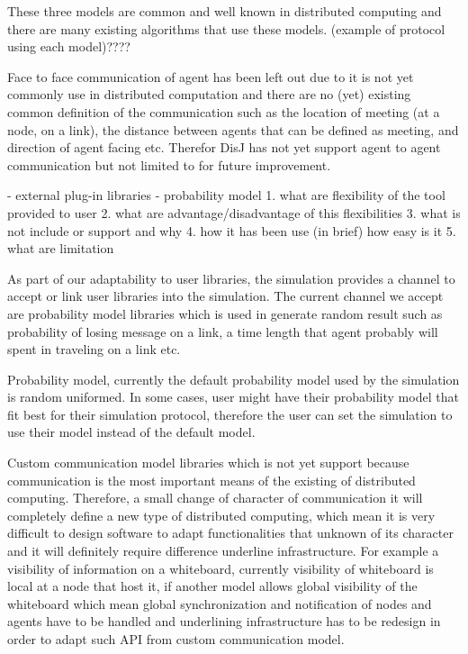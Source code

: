 These three models are common and well known in distributed computing and there are many existing algorithms that use these models. (example of protocol using each model)????

Face to face communication of agent has been left out due to it is not yet commonly use in distributed computation and there are no (yet) existing common definition of the communication such as the location of meeting (at a node, on a link), the distance between agents that can be defined as meeting, and direction of agent facing etc. Therefor DisJ has not yet support agent to agent communication but not limited to for future improvement.


- external plug-in libraries
	- probability model
1. what are flexibility of the tool provided to user
2. what are advantage/disadvantage of this flexibilities
3. what is not include or support and why
4. how it has been use (in brief) how easy is it
5. what are limitation

As part of our adaptability to user libraries, the simulation provides a channel to accept or link user libraries into the simulation. The current channel we accept are probability model libraries which is used in generate random result such as probability of losing message on a link, a time length that agent probably will spent in traveling on a link etc.

Probability model, currently the default probability model used by the simulation is random uniformed. In some cases, user might have their probability model that fit best for their simulation protocol, therefore the user can set the simulation to use their model instead of the default model.

Custom communication model libraries which is not yet support because communication is the most important means of the existing of distributed computing. Therefore, a small change of character of communication it will completely define a new type of distributed computing, which mean it is very difficult to design software to adapt functionalities that unknown of its character and it will definitely require difference underline infrastructure. For example a visibility of information on a whiteboard, currently visibility of whiteboard is local at a node that host it, if another model allows global visibility of the whiteboard which mean global synchronization and notification of nodes and agents have to be handled and underlining infrastructure has to be redesign in order to adapt such API from custom communication model.

